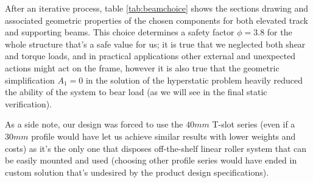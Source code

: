 	
	
	After an iterative process, table \ref{tab:beamchoice} shows the sections drawing and associated geometric properties of the chosen components for both elevated track and supporting beams. This choice determines a safety factor $\phi = 3.8$ for the whole structure that's a safe value for us; it is true that we neglected both shear and torque loads, and in practical applications other external and unexpected actions might act on the frame, however it is also true that the geometric simplification $A_1 = 0$ in the solution of the hyperstatic problem heavily reduced the ability of the system to bear load (as we will see in the final static verification).
	
	As a side note, our design was forced to use the $40mm$ T-slot series (even if a $30mm$ profile would have let us achieve similar results with lower weights and costs) as it's the only one that disposes off-the-shelf linear roller system that can be easily mounted and used (choosing other profile series would have ended in custom solution that's undesired by the product design specifications).
	
	
	

	
	
	
	
	
	
	
	
	
	
	
	
	
	
	
	
	
	
	
	
	
	
	
	
	
	
	
	
	
	
	
	